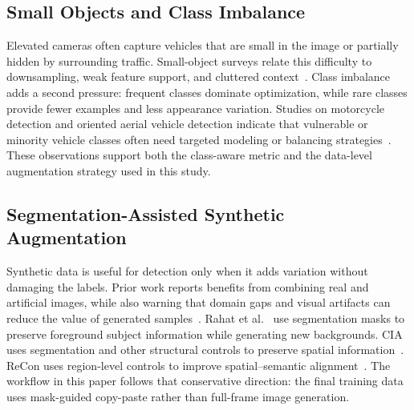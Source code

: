 \subsection{Small Objects and Class Imbalance}
\label{sec:small_objects_imbalance}

Elevated cameras often capture vehicles that are small in the image or partially hidden by surrounding traffic. Small-object surveys relate this difficulty to downsampling, weak feature support, and cluttered context~\cite{Cheng2023SmallObjectSurvey,Nikouei2025SmallObjectSurvey}. Class imbalance adds a second pressure: frequent classes dominate optimization, while rare classes provide fewer examples and less appearance variation. Studies on motorcycle detection and oriented aerial vehicle detection indicate that vulnerable or minority vehicle classes often need targeted modeling or balancing strategies~\cite{Espinosa2020,Mo2020}. These observations support both the class-aware metric and the data-level augmentation strategy used in this study.

\subsection{Segmentation-Assisted Synthetic Augmentation}
\label{sec:segmentation_assisted_augmentation_background}

Synthetic data is useful for detection only when it adds variation without damaging the labels. Prior work reports benefits from combining real and artificial images, while also warning that domain gaps and visual artifacts can reduce the value of generated samples~\cite{Weber2021ArtificialImagesVehicleDetection,Mumuni2024}. Rahat et al.~\cite{Rahat2024} use segmentation masks to preserve foreground subject information while generating new backgrounds. CIA uses segmentation and other structural controls to preserve spatial information~\cite{Benkedadra2024}. ReCon uses region-level controls to improve spatial--semantic alignment~\cite{ZhuH2025}. The workflow in this paper follows that conservative direction: the final training data uses mask-guided copy-paste rather than full-frame image generation.
